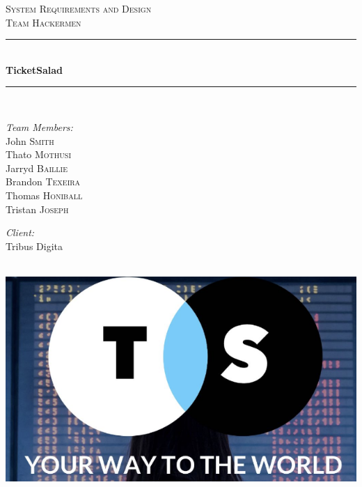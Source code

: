 \documentclass[11pt]{article}
\begin{document}
	\begin{titlepage}
		
		\newcommand{\HRule}{\rule{\linewidth}{0.5mm}} 
		
		\center 
		
		\textsc{\LARGE System Requirements and Design}\\[0.5cm] 
		\textsc{\Large Team Hackermen}\\[0.5cm] 
		
		\HRule \\[0.4cm]
		{ \huge \bfseries TicketSalad}\\[0.4cm] 
		\HRule \\[1.5cm]
		
		\begin{minipage}{0.4\textwidth}
			\begin{flushleft} \large
				\emph{Team Members:}\\
				John \textsc{Smith} \\%
				Thato \textsc{Mothusi}\\
				Jarryd \textsc{Baillie}\\
				Brandon \textsc{Texeira}\\
				Thomas \textsc{Honiball}\\
				Tristan \textsc{Joseph}\\
			\end{flushleft}
		\end{minipage}
		
		\begin{minipage}{0.4\textwidth}
			\begin{flushright} \large
				\emph{Client:} \\
				Tribus Digita 
			\end{flushright}
		\end{minipage}\\[2cm]
		
		\includegraphics{logo.png}\\[1cm] 
		
	\end{titlepage}
	\newpage
	\tableofcontents
	\newpage
\end{document}

